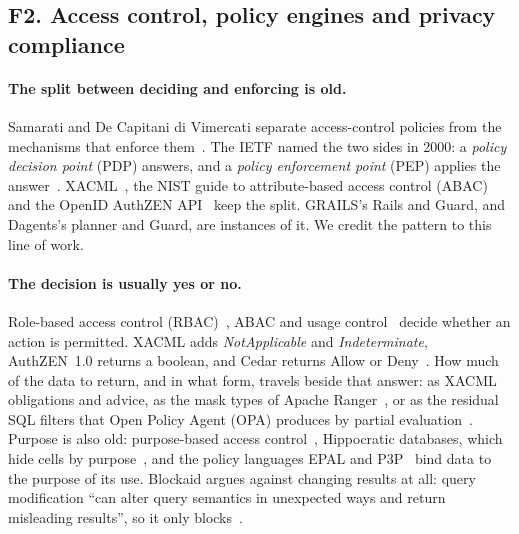 \subsection{F2. Access control, policy engines and privacy compliance}
\label{sec:survey-policy}

\paragraph{The split between deciding and enforcing is old.} Samarati and De
Capitani di Vimercati separate access-control policies from the mechanisms
that enforce them~\citep{samarati2001access}. The IETF named the two sides in
2000: a \emph{policy decision point} (PDP) answers, and a \emph{policy
enforcement point} (PEP) applies the answer~\citep{yavatkar2000framework}.
XACML~\citep{oasis2013xacml}, the NIST guide to attribute-based access control
(ABAC)~\citep{hu2014guide} and the OpenID AuthZEN API~\citep{openid2026authzen}
keep the split. GRAILS's Rails and Guard, and Dagents's planner and Guard, are
instances of it. We credit the pattern to this line of work.

\paragraph{The decision is usually yes or no.} Role-based access control
(RBAC)~\citep{sandhu1996role,ferraiolo2001proposed}, ABAC and usage
control~\citep{park2004ucon} decide whether an action is permitted. XACML adds
\emph{NotApplicable} and \emph{Indeterminate}, AuthZEN~1.0 returns a boolean, and
Cedar returns Allow or Deny~\citep{cutler2024cedar}. How much of the data to
return, and in what form, travels beside that answer: as XACML obligations and
advice, as the mask types of Apache Ranger~\citep{ranger2026integrating}, or as
the residual SQL filters that Open Policy Agent (OPA) produces by partial
evaluation~\citep{opa2026filtering}. Purpose is also old: purpose-based access
control~\citep{byun2008purpose}, Hippocratic databases, which hide cells by
purpose~\citep{agrawal2002hippocratic,lefevre2004limiting}, and the policy
languages EPAL and P3P~\citep{powers2003epal,w3c2002p3p} bind data to the
purpose of its use. Blockaid argues against changing results at all: query
modification ``can alter query semantics in unexpected ways and return
misleading results'', so it only blocks~\citep[\S2]{zhang2022blockaid}.

